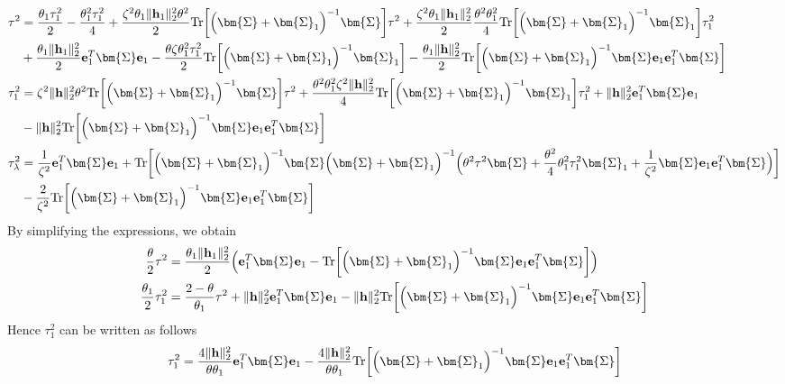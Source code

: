 \documentclass[final]{l4dc2026}
\newcommand{\bSigma}{\bm{\Sigma}}
\newcommand{\be}{\mathbf{e}}
\newcommand{\bh}{\mathbf{h}}
\newcommand{\tr}{\text{Tr}}
\begin{document}
\begin{align*}
    \tau^2 &= \frac{\theta_1 \tau^2_1}{2} - \frac{\theta_1^2 \tau_1^2}{4} + \frac{\zeta^2 \theta_1 \|\bh_1\|_2^2 \theta^2 }{2} \tr \biggl[ \Bigl(\bSigma + \bSigma_1 \Bigr)^{-1} \bSigma \biggr] \tau^2  +  \frac{\zeta^2 \theta_1 \|\bh_1\|_2^2 }{2} \frac{\theta^2  \theta^2_1}{4} \tr \biggl[\Bigl(\bSigma + \bSigma_1 \Bigr)^{-1} \bSigma_1 \biggr]\tau_1^2 \\
    &+\frac{\theta_1 \|\bh_1\|_2^2}{2} \be_1^T \bSigma \be_1- \frac{\theta \zeta \theta^2_1 \tau_1^2  }{2} \tr\biggl[\Bigl(\bSigma + \bSigma_1 \Bigr)^{-1}\bSigma_1\biggr] - \frac{\theta_1 \|\bh\|_2^2}{2} \tr \biggl[\Bigl(\bSigma + \bSigma_1\Bigr)^{-1} \bSigma \be_1 \be_1^T \bSigma\biggr]\\
    \tau_1^2 &= \zeta^2 \|\bh\|_2^2 \theta^2 \tr\biggl[\Bigl(\bSigma + \bSigma_1 \Bigr)^{-1} \bSigma\biggr] \tau^2 + \frac{\theta^2\theta^2_1 \zeta^2 \|\bh\|_2^2}{4}   \tr\biggl[\Bigl(\bSigma + \bSigma_1 \Bigr)^{-1} \bSigma_1 \biggr] \tau_1^2 + \|\bh\|_2^2 \be_1^T \bSigma \be_1 \\
    &- \|\bh\|_2^2 \tr\biggl[\Bigl(\bSigma + \bSigma_1\Bigr)^{-1}  \bSigma \be_1 \be_1^T \bSigma\biggr]\\
    \tau^2_{\lambda} &=  \frac{1}{\zeta^2} \be_1^T \bSigma \be_1 +\tr \biggl[\Bigl(\bSigma + \bSigma_1 \Bigr)^{-1} \bSigma \Bigl(\bSigma + \bSigma_1 \Bigr)^{-1} \Bigl(\theta^2 \tau^2 \bSigma + \frac{\theta^2}{4}  \theta^2_1 \tau_1^2  \bSigma_1  + \frac{1}{\zeta^2}\bSigma \be_1 \be_1^T \bSigma\Bigr)\biggr] \\ 
     &-\frac{2}{\zeta^2} \tr\biggl[\Bigl(\bSigma + \bSigma_1\Bigr)^{-1}  \bSigma \be_1 \be_1^T \bSigma\biggr]
\end{align*}
By simplifying the expressions, we obtain
\begin{align*}
    \frac{\theta}{2}\tau^2 &= \frac{\theta_1 \|\bh_1\|_2^2}{2} \Bigl(\be_1^T \bSigma \be_1 - \tr \biggl[\Bigl(\bSigma + \bSigma_1\Bigr)^{-1} \bSigma \be_1 \be_1^T \bSigma \biggr]\Bigr)\\
      \frac{\theta_1}{2}\tau_1^2 &= \frac{2-\theta}{\theta_1}\tau^2 + \|\bh\|_2^2 \be_1^T \bSigma \be_1 - \|\bh\|_2^2 \tr\biggl[\Bigl(\bSigma + \bSigma_1\Bigr)^{-1}  \bSigma \be_1 \be_1^T \bSigma\biggr]
\end{align*}
Hence $\tau_1^2$ can be written as follows
\begin{align*}
    \tau_1^2 = \frac{4 \|\bh\|_2^2}{\theta \theta_1} \be_1^T \bSigma \be_1 - \frac{4 \|\bh\|_2^2}{\theta\theta_1} \tr\biggl[\Bigl(\bSigma + \bSigma_1\Bigr)^{-1}  \bSigma \be_1 \be_1^T \bSigma\biggr]
\end{align*}
\end{document}

